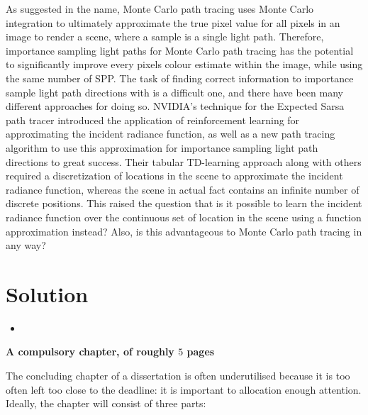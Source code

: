 \documentclass[../dissertation.tex]{subfiles}
\begin{document}
As suggested in the name, Monte Carlo path tracing uses Monte Carlo integration to ultimately approximate the true pixel value for all pixels in an image to render a scene, where a sample is a single light path. Therefore, importance sampling light paths for Monte Carlo path tracing has the potential to significantly improve every pixels colour estimate within the image, while using the same number of SPP. The task of finding correct information to importance sample light path directions with is a difficult one, and there have been many different approaches for doing so. NVIDIA's technique for the Expected Sarsa path tracer introduced the application of reinforcement learning for approximating the incident radiance function, as well as a new path tracing algorithm to use this approximation for importance sampling light path directions to great success. Their tabular TD-learning approach along with others required a discretization of locations in the scene to approximate the incident radiance function, whereas the scene in actual fact contains an infinite number of discrete positions. This raised the question that is it possible to learn the incident radiance function over the continuous set of location in the scene using a function approximation instead? Also, is this advantageous to Monte Carlo path tracing in any way?

\section*{Solution}

\begin{itemize}
\item 
\end{itemize}

{\bf A compulsory chapter,     of roughly $5$ pages} 
\vspace{1cm} 

\noindent
The concluding chapter of a dissertation is often underutilised because it 
is too often left too close to the deadline: it is important to allocation
enough attention.  Ideally, the chapter will consist of three parts:
\end{document}
